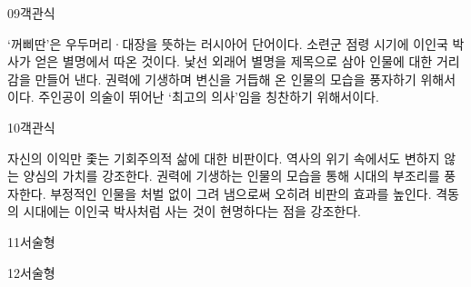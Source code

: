 \documentclass[fs9,seriesRus]{korfarm-base}
\begin{document}
\begin{kfQBlock}{09}{객관식}
\begin{kfChoices}
\kfChoice ‘꺼삐딴’은 우두머리·대장을 뜻하는 러시아어 단어이다.
\kfChoice 소련군 점령 시기에 이인국 박사가 얻은 별명에서 따온 것이다.
\kfChoice 낯선 외래어 별명을 제목으로 삼아 인물에 대한 거리감을 만들어 낸다.
\kfChoice 권력에 기생하며 변신을 거듭해 온 인물의 모습을 풍자하기 위해서이다.
\kfChoice 주인공이 의술이 뛰어난 ‘최고의 의사’임을 칭찬하기 위해서이다.
\end{kfChoices}
\end{kfQBlock}
\begin{kfQBlock}{10}{객관식}
\begin{kfChoices}
\kfChoice 자신의 이익만 좇는 기회주의적 삶에 대한 비판이다.
\kfChoice 역사의 위기 속에서도 변하지 않는 양심의 가치를 강조한다.
\kfChoice 권력에 기생하는 인물의 모습을 통해 시대의 부조리를 풍자한다.
\kfChoice 부정적인 인물을 처벌 없이 그려 냄으로써 오히려 비판의 효과를 높인다.
\kfChoice 격동의 시대에는 이인국 박사처럼 사는 것이 현명하다는 점을 강조한다.
\end{kfChoices}
\end{kfQBlock}
\begin{kfQBlock}{11}{서술형}
\end{kfQBlock}
\begin{kfQBlock}{12}{서술형}
\end{kfQBlock}
\kfEndMC


\end{document}
